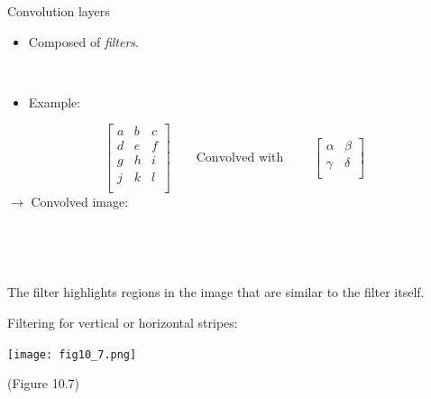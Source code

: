 \documentclass[
  10pt,
  ignorenonframetext,
  twocolumn]{beamer}
\providecommand{\tightlist}{%
  \setlength{\itemsep}{0pt}\setlength{\parskip}{0pt}}
\begin{document}
\begin{frame}
\begin{block}{Convolution layers}
\label{convolution-layers}
\(~\)

\begin{itemize}
\tightlist
\item
  Composed of \emph{filters}.
\end{itemize}

\(~\)

\begin{itemize}
\tightlist
\item
  Example:
\end{itemize}

\[\left[ 
\begin{matrix}
a & b & c \\
d & e & f \\
g & h & i\\
j & k & l \\
\end{matrix}
\right] \qquad \text{Convolved with } \qquad 
\left[ 
\begin{matrix}
\alpha & \beta \\
\gamma & \delta \\
\end{matrix}\right] \] \(\rightarrow\) Convolved image:

\(~\)

\vspace{2cm}

\(~\)

The filter highlights regions in the image that are similar to the
filter itself.
\end{block}
\end{frame}

\begin{frame}
Filtering for vertical or horizontal stripes:

\centering

\texttt{[image: fig10\_7.png]}

\scriptsize

(Figure 10.7)
\end{frame}
\end{document}
